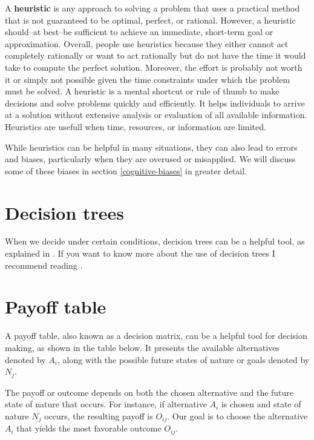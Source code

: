 \documentclass[
  12pt,
  oneside]{book}
\theoremstyle{definition}
\theoremstyle{definition}
\theoremstyle{definition}
\theoremstyle{definition}
\theoremstyle{remark}
\begin{document}
A \textbf{heuristic} is any approach to solving a problem that uses a practical method that is not guaranteed to be optimal, perfect, or rational. However, a heuristic should--at best--be sufficient to achieve an immediate, short-term goal or approximation. Overall, people use heuristics because they either cannot act completely rationally or want to act rationally but do not have the time it would take to compute the perfect solution. Moreover, the effort is probably not worth it or simply not possible given the time constraints under which the problem must be solved.
A heuristic is a mental shortcut or rule of thumb to make decisions and solve problems quickly and efficiently. It helps individuals to arrive at a solution without extensive analysis or evaluation of all available information. Heuristics are usefull when time, resources, or information are limited.

While heuristics can be helpful in many situations, they can also lead to errors and biases, particularly when they are overused or misapplied. We will discuss some of these biases in section \ref{cognitive-biases} in greater detail.

\hypertarget{decision-trees}{%
\section{Decision trees}\label{decision-trees}}

When we decide under certain conditions, decision trees can be a helpful tool, as explained in \citep{Finne1998three}. If you want to know more about the use of decision trees I recommend reading \citet[ch.~4]{Bonanno2017Decision}.

\hypertarget{payoff-table}{%
\section{Payoff table}\label{payoff-table}}

A payoff table, also known as a decision matrix, can be a helpful tool for decision making, as shown in the table below. It presents the available alternatives denoted by \(A_i\), along with the possible future states of nature or goals denoted by \(N_j\).

The payoff or outcome depends on both the chosen alternative and the future state of nature that occurs. For instance, if alternative \(A_i\) is chosen and state of nature \(N_j\) occurs, the resulting payoff is \(O_{ij}\). Our goal is to choose the alternative \(A_i\) that yields the most favorable outcome \(O_{ij}\).
\end{document}
